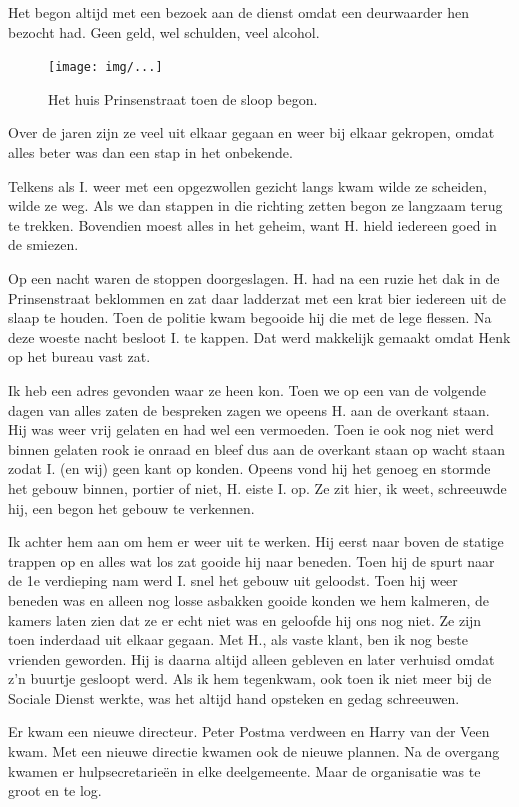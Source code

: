 \documentclass[12pt,twoside, openright]{memoir}
\begin{document}
Het begon altijd met een bezoek aan de dienst omdat een deurwaarder hen bezocht had. Geen geld, wel schulden, veel alcohol.

\begin{figure}[t]
\texttt{[image: img/...]}
\caption{Het huis Prinsenstraat toen de sloop begon.}
\end{figure}

Over de jaren zijn ze veel uit elkaar gegaan en weer bij elkaar gekropen, omdat alles beter was dan een stap in het onbekende. 

Telkens als I. weer met een opgezwollen gezicht langs kwam wilde ze scheiden, wilde ze weg. Als we dan stappen in die richting zetten begon ze langzaam terug te trekken. Bovendien moest alles in het geheim, want H. hield iedereen goed in de smiezen. 

Op een nacht waren de stoppen doorgeslagen. H. had na een ruzie het dak in de Prinsenstraat beklommen en zat daar ladderzat met een krat bier iedereen uit de slaap te houden. Toen de politie kwam begooide hij die met de lege flessen. Na deze woeste nacht besloot I. te kappen. Dat werd makkelijk gemaakt omdat Henk op het bureau vast zat. 

Ik heb een adres gevonden waar ze heen kon. Toen we op een van de volgende dagen van alles zaten de bespreken zagen we opeens H. aan de overkant staan. Hij was weer vrij gelaten en had wel een vermoeden. Toen ie ook nog niet werd binnen gelaten rook ie onraad en bleef dus aan de overkant staan op wacht staan zodat I. (en wij) geen kant op konden. Opeens vond hij het genoeg en stormde het gebouw binnen, portier of niet, H. eiste I. op. Ze zit hier, ik weet, schreeuwde hij, een begon het gebouw te verkennen. 

Ik achter hem aan om hem er weer uit te werken. Hij eerst naar boven de statige trappen op en alles wat los zat gooide hij naar beneden. Toen hij de spurt naar de 1e verdieping nam werd I. snel het gebouw uit geloodst. Toen hij weer beneden was en alleen nog losse asbakken gooide konden we hem kalmeren, de kamers laten zien dat ze er echt niet was en geloofde hij ons nog niet. Ze zijn toen inderdaad uit elkaar gegaan. Met H., als vaste klant, ben ik nog beste vrienden geworden. Hij is daarna altijd alleen gebleven en later verhuisd omdat z’n buurtje gesloopt werd. Als ik hem tegenkwam, ook toen ik niet meer bij de Sociale Dienst werkte, was het altijd hand opsteken en gedag schreeuwen.

Er kwam een nieuwe directeur. Peter Postma verdween en Harry van der Veen kwam. Met een nieuwe directie kwamen ook de nieuwe plannen. Na de overgang kwamen er hulpsecretarieën in elke deelgemeente. Maar de organisatie was te groot en te log. 
\end{document}
